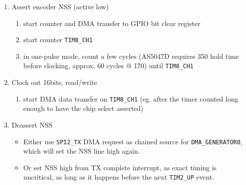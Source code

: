 \documentclass[12pt,a4paper,oneside,openany]{article}
\begin{document}
\begin{enumerate}
\item Assert encoder NSS (active low)
    \begin{enumerate}
    \item start counter and DMA transfer to GPIO bit clear register
    \item start counter \texttt{TIM8\_CH1}
    \item in one-pulse mode, count a few cycles (AS5047D requires \unit{350}{\nano\second} hold time before clocking, approx. 60 cycles @ \unit{170}{\mega\hertz}) until \texttt{TIM8\_CH1}
    \end{enumerate}
\item Clock out 16bits, read/write
    \begin{enumerate}
    \item start DMA data transfer on \texttt{TIM8\_CH1} (eg. after the timer counted long enough to have the chip select asserted)
    \end{enumerate}
\item Deassert NSS
    \begin{itemize}
    \item Either use \texttt{SPI2\_TX} DMA request as chained source for \texttt{DMA\_GENERATOR0}, which will set the NSS line high again.
    \item Or set NSS high from TX complete interrupt, as exact timing is uncritical, as long as it happens before the next \texttt{TIM2\_UP} event.
    \end{itemize}
\end{enumerate}
\end{document}
